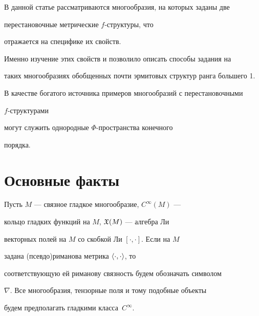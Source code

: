 








В данной статье рассматриваются многообразия, на которых заданы две


перестановочные метрические $f$-структуры, что


отражается на специфике их свойств.


Именно изучение этих свойств и позволило описать способы задания на


таких многообразиях обобщенных почти эрмитовых структур ранга большего 1.


В качестве богатого источника примеров многообразий с перестановочными


$f$-структурами


могут служить однородные $\Phi$-пространства конечного


порядка.








\section{Основные факты}





Пусть $M$ --- связное гладкое многообразие, $C^\infty(M)$ ---


кольцо гладких функций на $M$, $\frak{X}(M)$ --- алгебра Ли


векторных полей на $M$ со скобкой Ли $[\cdot,\cdot]$. Если на $M$


задана (псевдо)риманова метрика $\langle\cdot,\cdot\rangle$, то


соответствующую ей риманову связность будем обозначать символом


$\nabla$. Все многообразия, тензорные поля и тому подобные объекты


будем предполагать гладкими класса~$C^\infty$.





